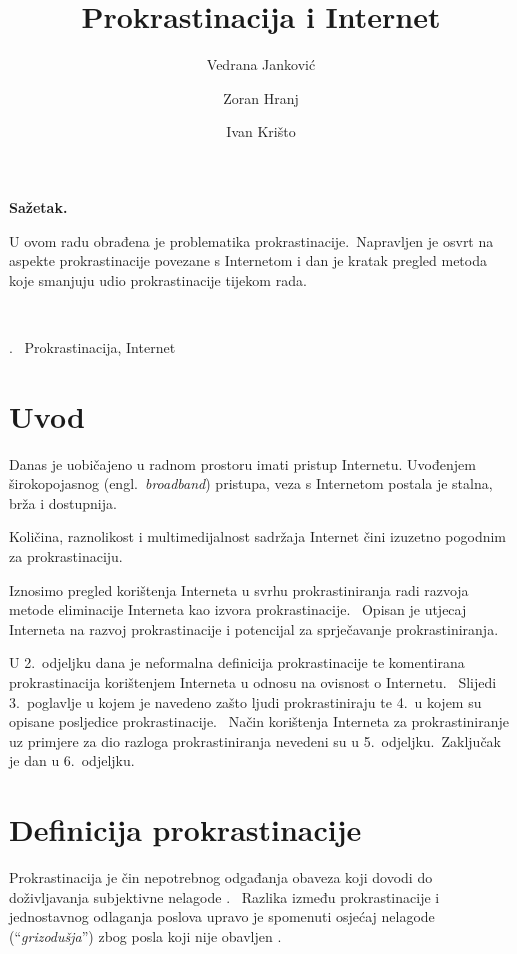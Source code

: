 \documentclass[11pt,twocolumn,english]{article}
\let\LaTeXtitle\title
\renewcommand{\title}[1]{\LaTeXtitle{\Large \textbf{#1}}}
\renewenvironment{abstract}
{\noindent \large \bf Sažetak.\normalsize\begin{it}}
{\end{it}\\}
\newenvironment{keywords}
{\noindent {\large {\bf Ključne riječi}}.~}{}
\newcommand{\engl}[1]{(engl.~\emph{#1})}
\begin{document}
\title{Prokrastinacija i Internet}
\author{Vedrana Janković}
\author{Zoran Hranj}
\author{Ivan Krišto}

\date{}

\maketitle
\thispagestyle{empty}
\pagestyle{empty}

\begin{abstract}

U ovom radu obrađena je problematika prokrastinacije.~Napravljen je 
osvrt na aspekte prokrastinacije povezane s Internetom i dan je kratak 
pregled metoda koje smanjuju udio prokrastinacije tijekom rada.
\end{abstract}

\begin{keywords}
Prokrastinacija, Internet
\end{keywords}


\section{Uvod}
Danas je uobičajeno u radnom prostoru imati pristup Internetu. Uvođenjem
širokopojasnog \engl{broadband} pristupa, veza s Internetom postala je stalna,
brža i dostupnija.

Količina, raznolikost i multimedijalnost sadržaja Internet čini izuzetno
pogodnim za prokrastinaciju.

Iznosimo pregled korištenja Interneta u svrhu prokrastiniranja radi razvoja
metode eliminacije Interneta kao izvora prokrastinacije.~ Opisan je utjecaj 
Interneta na razvoj prokrastinacije i potencijal za sprječavanje prokrastiniranja.

U 2.~odjeljku dana je neformalna definicija prokrastinacije te komentirana
prokrastinacija korištenjem Interneta u odnosu na ovisnost o Internetu.~ Slijedi
3.~poglavlje u kojem je navedeno zašto ljudi prokrastiniraju te 4.~u kojem su
opisane posljedice prokrastinacije.~ Način korištenja Interneta za
prokrastiniranje uz primjere za dio razloga prokrastiniranja nevedeni su u
5.~odjeljku.~Zaključak je dan u 6.~odjeljku.


\section{Definicija prokrastinacije}
Prokrastinacija je čin nepotrebnog odgađanja obaveza koji dovodi do 
doživljavanja subjektivne nelagode \cite{solomon1984academic}.~ Razlika između
prokrastinacije i jednostavnog odlaganja poslova upravo je spomenuti osjećaj
nelagode (``\emph{grizodušja}'') zbog posla koji nije obavljen
\cite{burka2004procrastination}.
\end{document}
